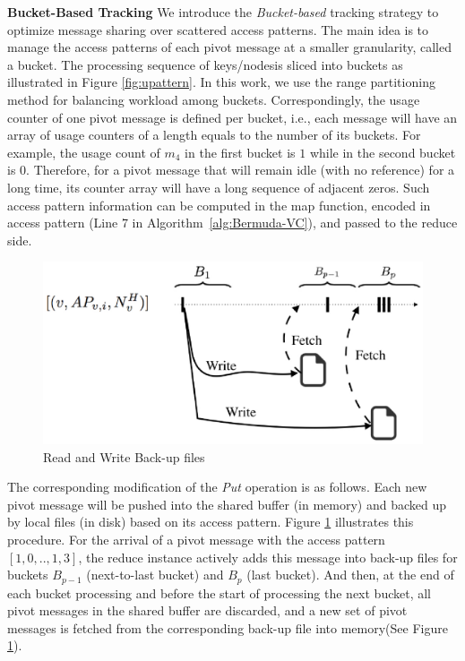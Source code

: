 \hspace{-2em}
\textbf{Bucket-Based Tracking}
We introduce the \emph{Bucket-based} tracking strategy to optimize message sharing over scattered access patterns. The main idea is to manage the access patterns of each pivot message at a smaller granularity, called a {bucket}. The processing sequence of keys/nodesis sliced into buckets as illustrated in Figure \ref{fig:upattern}. 
In this work, we use the range partitioning method for balancing workload among buckets. 
Correspondingly, the usage counter of one pivot message is defined per bucket, i.e., each message will have an array of usage counters of a length equals to the number of its buckets. 
For example, the usage count of $m_4$ in the first bucket is $1$ while in the second bucket is $0$. 
Therefore, for a pivot message that will remain idle (with no reference) for a long time, its counter array will have a long sequence of adjacent zeros. Such access pattern information can be computed in the map function, encoded in access pattern (Line 7 in Algorithm~\ref{alg:Bermuda-VC}), and passed to the reduce side. 

\begin{figure}[t]
		\centering	
		\includegraphics[scale=0.4]{figures/bermuda/bucketFetching.eps}
		\caption {Read and Write Back-up files}
		\label{fig:bucketFetch}
\end{figure}

The corresponding modification of the \emph{Put} operation is as follows.  Each new pivot message will be pushed into the shared buffer (in memory) and backed up by local files (in disk) based on its access pattern. 
Figure \ref{fig:bucketFetch} illustrates this procedure. For the arrival of a pivot message with the access pattern $[1,0,.., 1,3]$, the reduce instance actively adds this message into back-up files for buckets $B_{p-1}$ (next-to-last bucket) and $B_{p}$ (last bucket). And then, at the end of each bucket processing and before the start of processing the next bucket, 
all pivot messages in the shared buffer are discarded, and a new set of pivot messages is fetched from the corresponding back-up file into memory(See Figure \ref{fig:bucketFetch}). 

